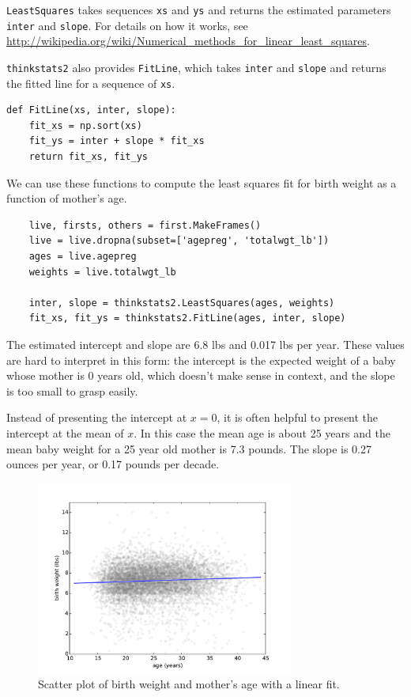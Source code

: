 \documentclass[12pt]{book}
\begin{document}
{\tt LeastSquares} takes sequences
{\tt xs} and {\tt ys} and returns the estimated parameters {\tt inter}
and {\tt slope}.
For details on how it works, see
\url{http://wikipedia.org/wiki/Numerical_methods_for_linear_least_squares}.

{\tt thinkstats2} also provides {\tt FitLine}, which takes {\tt inter}
and {\tt slope} and returns the fitted line for a sequence
of {\tt xs}.

\begin{verbatim}
def FitLine(xs, inter, slope):
    fit_xs = np.sort(xs)
    fit_ys = inter + slope * fit_xs
    return fit_xs, fit_ys
\end{verbatim}

We can use these functions to compute the least squares fit for
birth weight as a function of mother's age.

\begin{verbatim}
    live, firsts, others = first.MakeFrames()
    live = live.dropna(subset=['agepreg', 'totalwgt_lb'])
    ages = live.agepreg
    weights = live.totalwgt_lb

    inter, slope = thinkstats2.LeastSquares(ages, weights)
    fit_xs, fit_ys = thinkstats2.FitLine(ages, inter, slope)
\end{verbatim}

The estimated intercept and slope are 6.8 lbs and 0.017 lbs per year.
These values are hard to interpret in this form: the intercept is
the expected weight of a baby whose mother is 0 years old, which
doesn't make sense in context, and the slope is too small to
grasp easily.

Instead of presenting the intercept at $x=0$, it
is often helpful to present the intercept at the mean of $x$.  In
this case the mean age is about 25 years and the mean baby weight
for a 25 year old mother is 7.3 pounds.  The slope is 0.27 ounces
per year, or 0.17 pounds per decade.

\begin{figure}
\centerline{\includegraphics[height=2.5in]{figs/linear1.pdf}}
\caption{Scatter plot of birth weight and mother's age with
a linear fit.}
\label{linear1}
\end{figure}
\end{document}
